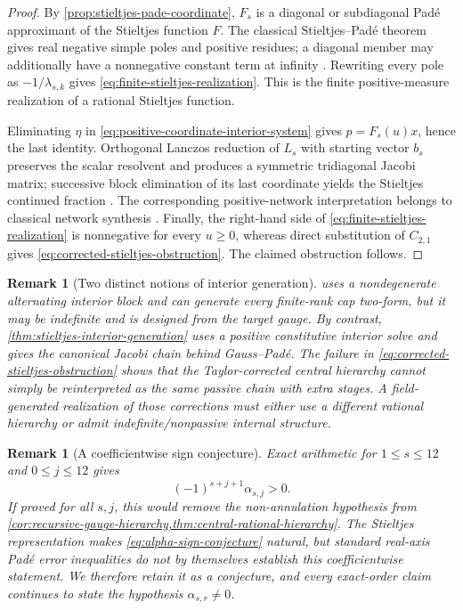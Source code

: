\documentclass[11pt,a4paper]{article}
\newtheorem{remark}[theorem]{Remark}
\begin{document}
\begin{proof}
By \cref{prop:stieltjes-pade-coordinate}, \(F_s\) is a diagonal or
subdiagonal Pad\'e approximant of the Stieltjes function \(F\).  The
classical Stieltjes--Pad\'e theorem gives real negative simple poles and
positive residues; a diagonal member may additionally have a nonnegative
constant term at infinity \cite{wynn1968}.  Rewriting every pole as
\(-1/\lambda_{s,k}\) gives \cref{eq:finite-stieltjes-realization}.
This is the finite positive-measure realization of a rational Stieltjes
function.

Eliminating \(\eta\) in
\cref{eq:positive-coordinate-interior-system} gives \(p=F_s(u)x\), hence
the last identity.  Orthogonal Lanczos reduction of \(L_s\) with starting
vector \(b_s\) preserves the scalar resolvent and produces a symmetric
tridiagonal Jacobi matrix; successive block elimination of its last
coordinate yields the Stieltjes continued fraction \cite{wall1948}.
The corresponding positive-network interpretation belongs to classical
network synthesis \cite{basubose1983}.  Finally, the right-hand side
of \cref{eq:finite-stieltjes-realization} is nonnegative for every
\(u\ge0\), whereas direct substitution of \(C_{2,1}\) gives
\cref{eq:corrected-stieltjes-obstruction}.  The claimed obstruction
follows.
\end{proof}

\begin{remark}[Two distinct notions of interior generation]
\label{rem:two-interior-generations}
 uses a nondegenerate alternating
interior block and can generate every finite-rank cap two-form, but it may
be indefinite and is designed from the target gauge.  By contrast,
\cref{thm:stieltjes-interior-generation} uses a positive constitutive
interior solve and gives the canonical Jacobi chain behind Gauss--Pad\'e.
The failure in \cref{eq:corrected-stieltjes-obstruction} shows that the
Taylor-corrected central hierarchy cannot simply be reinterpreted as the
same passive chain with extra stages.  A field-generated realization of
those corrections must either use a different rational hierarchy or admit
indefinite/nonpassive internal structure.
\end{remark}

\begin{remark}[A coefficientwise sign conjecture]
\label{rem:alpha-sign-conjecture}
Exact arithmetic for \(1\le s\le12\) and \(0\le j\le12\) gives
\begin{equation}\label{eq:alpha-sign-conjecture}
 (-1)^{s+j+1}\alpha_{s,j}>0.
\end{equation}
If proved for all \(s,j\), this would remove the non-annulation hypothesis
from \cref{cor:recursive-gauge-hierarchy,thm:central-rational-hierarchy}.
The Stieltjes representation makes \cref{eq:alpha-sign-conjecture}
natural, but standard real-axis Pad\'e error inequalities do not by
themselves establish this coefficientwise statement.  We therefore retain
it as a conjecture, and every exact-order claim continues to state the
hypothesis \(\alpha_{s,r}\ne0\).
\end{remark}
\end{document}
